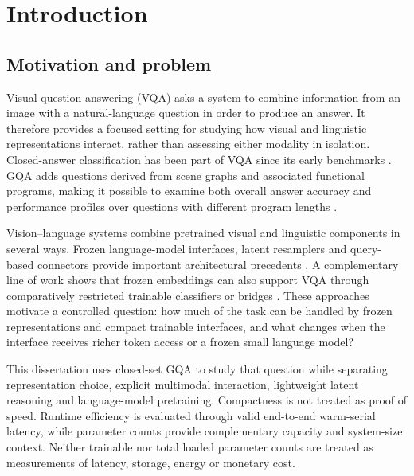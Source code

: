 \chapter{Introduction}

\section{Motivation and problem}
\label{sec:ch1-motivation}

Visual question answering (VQA) asks a system to combine information from an
image with a natural-language question in order to produce an answer. It
therefore provides a focused setting for studying how visual and linguistic
representations interact, rather than assessing either modality in isolation.
Closed-answer classification has been part of VQA since its early benchmarks
\citep{antol2015vqa}. GQA adds questions derived from scene graphs and
associated functional programs, making it possible to examine both overall
answer accuracy and performance profiles over questions with different
program lengths \citep{hudson2019gqa}.

\begingroup
\setlength{\emergencystretch}{1em}
Vision--language systems combine pretrained visual and linguistic components
in several ways. Frozen language-model interfaces, latent resamplers and
query-based connectors provide important architectural precedents
\citep{tsimpoukelli2021frozen,alayrac2022flamingo,li2023blip2,jaegle2021perceiver}.
A complementary line of work shows that frozen embeddings can also support VQA
through comparatively restricted trainable classifiers or bridges
\citep{deuser2022less,merullo2023limber}. These approaches
motivate a controlled question: how much of the task can be handled by frozen
representations and compact trainable interfaces, and what changes when the
interface receives richer token access or a frozen small language model?\par
\endgroup

This dissertation uses closed-set GQA to study that question while separating
representation choice, explicit multimodal interaction, lightweight latent
reasoning and language-model pretraining. Compactness is not treated as proof
of speed. Runtime efficiency is evaluated through valid end-to-end warm-serial
latency, while parameter counts provide complementary capacity and system-size
context. Neither trainable nor total loaded parameter counts are treated as
measurements of latency, storage, energy or monetary cost.

